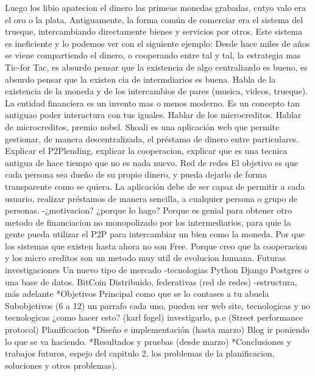 Luego los libio apatecion el dinero las primeas monedas grabadas, cutyo valo era el oro o la plata,
Antiguamente, la forma común de comerciar era el sistema del trueque, intercambiando directamente bienes y servicios por otros. Este sistema es ineficiente y lo podemos ver con el siguiente ejemplo:
Desde hace miles de años se viene compartiendo el dinero, o cooperando entre tal y tal, la estrategia mas Tic-for Tac, es absurdo pensar que la existencia de algo centraliazdo es bueno, es absurdo pensar que la existen cia de intermdiarios es buena. Habla de la existencia de la moneda y de los intercambios de pares (musica, videos, trueque). La entidad financiera es un invento mas o menos moderno. Es un concepto tan antiguao poder interactura con tus iguales. Hablar de los microcreditos.
Hablar de microcreditos, premio nobel.
Shoali es una aplicación web que permite gestionar, de manera descentralizada, el préstamo de dinero entre particulares. Explicar el P2Plending, explicar la cooperacion, explicar que es una tecnica antigua de hace tiempo que no es nada nuevo. Red de redes
El objetivo es que cada persona sea dueño de su propio dinero, y pueda dejarlo de forma transparente como se quiera. La aplicación debe de ser capaz de permitir a cada usuario, realizar préstamos de manera sencilla, a cualquier persona o grupo de personas.
-¿motivacion? ¿porque lo hago?
Porque es genial para obtener otro metodo de financiacion no monopolizado por los intermediarios, para quie la gente pueda utilizar el P2P para intercambiar un bien como la moneda. Por que los sistemas que existen hasta ahora no son Free. Porque creo que la cooperacion y los micro creditos son un metodo muy util de evolucion humana.
Futuras investigaciones
Un nuevo tipo de mercado
-tecnologias
Python
Django
Postgres o una base de datos.
BitCoin
Distribuido, federativas (red de redes)
-estructura, más adelante
*Objetivos
Principal como que se lo contases a tu abuela
Subobjetivos (6 a 12) un parrafo cada uno, pueden ser web site, tecnologicas y no tecnologicas ¿como hacer esto? (karl fogel) investigarlo, p.e (Street performance protocol)
Planificacion
*Diseño e implementación (hasta marzo) Blog ir poniendo lo que se va haciendo.
*Resultados y pruebas (desde marzo)
*Conclusiones y trabajos futuros, espejo del capitulo 2, los problemas de la planificacion, soluciones y otros problemas).
